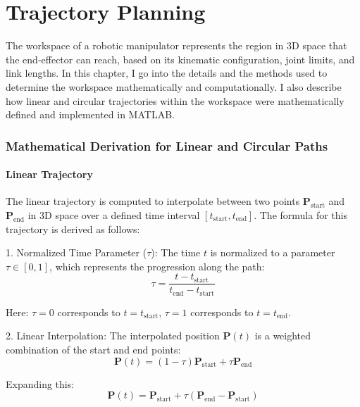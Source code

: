 \documentclass[12pt]{report}
\begin{document}
	\chapter{Trajectory Planning}
		\addtocounter{section}{4} 
	\addtocounter{subsection}{0}
	The workspace of a robotic manipulator represents the region in 3D space that the end-effector can reach, based on its kinematic configuration, joint limits, and link lengths. In this chapter, I go into the details and the methods used to determine the workspace mathematically and computationally. I also describe how linear and circular trajectories within the workspace were mathematically defined and implemented in MATLAB.
	
	\subsection{Mathematical Derivation for Linear and Circular Paths}
	
	\subsubsection{Linear Trajectory}
	
	The linear trajectory is computed to interpolate between two points \( \mathbf{P}_{\text{start}} \) and \( \mathbf{P}_{\text{end}} \) in 3D space over a defined time interval \([t_{\text{start}}, t_{\text{end}}]\). The formula for this trajectory is derived as follows:
	
	1. Normalized Time Parameter (\(\tau\)):
	The time \(t\) is normalized to a parameter \(\tau \in [0, 1]\), which represents the progression along the path:
\begin{equation}
	\tau = \frac{t - t_{\text{start}}}{t_{\text{end}} - t_{\text{start}}}
\end{equation}

	Here:
	\(\tau = 0\) corresponds to \(t = t_{\text{start}}\),
	 \(\tau = 1\) corresponds to \(t = t_{\text{end}}\).
	
	2. Linear Interpolation:
	The interpolated position \(\mathbf{P}(t)\) is a weighted combination of the start and end points:
	\begin{equation}
		\mathbf{P}(t) = (1 - \tau) \mathbf{P}_{\text{start}} + \tau \mathbf{P}_{\text{end}}
	\end{equation}
	
	Expanding this:
	\begin{equation}
		\mathbf{P}(t) = \mathbf{P}_{\text{start}} + \tau (\mathbf{P}_{\text{end}} - \mathbf{P}_{\text{start}})
	\end{equation}
	
\end{document}
